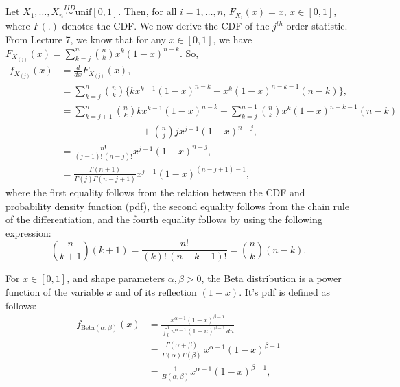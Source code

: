 \documentclass[a4paper,english,12pt]{article}
\begin{document}
\begin{exmp}
	Let $ X_1,\ldots,X_n \stackrel{IID}{\sim} \text{unif}\left[0,1\right] $. Then, for all $ i=1,\ldots,n $, $ F_{X_{i}}(x) = x $, $ x \in \left[0,1\right] $, where $ F(.) $ denotes the CDF. We now derive the CDF of the $ j^{th} $ order statistic. From Lecture 7, we know that for any $ x \in [0,1] $, we have $ F_{X_{\left(j\right)}} (x) = \sum_{k=j}^{n} \binom{n}{k} x^{k} (1-x)^{n-k}$. So,
	\begin{align}
	  	f_{X_{\left(j\right)}} (x)&=\frac{d}{dx} F_{X_{\left(j\right)}} (x),\nonumber\\
	  	&= \sum_{k=j}^{n} \binom{n}{k} \{k x^{k-1} (1-x)^{n-k} - x^{k} (1-x)^{n-k-1} (n-k)\},\nonumber\\
	  	&= \sum_{k=j+1}^{n} \binom{n}{k} k x^{k-1} (1-x)^{n-k}
	  	- \sum_{k=j}^{n-1} \binom{n}{k} x^{k} (1-x)^{n-k-1} (n-k)\nonumber\\
        &\hspace{100pt}+ \binom{n}{j} j x^{j-1} (1-x)^{n-j},\nonumber\\
	  	&= \frac{n!}{ (j-1)! \, (n-j)!  } x^{j-1} (1-x)^{n-j},\nonumber\\
	  	&= \frac{\Gamma(n+1)}{ \Gamma(j) \Gamma(n-j+1)  } x^{j-1} (1-x)^{(n-j+1)-1}, \label{unif_stat}
    \end{align}
    where the first equality follows from the relation between the CDF and probability density function (pdf), the second equality follows from the chain rule of the differentiation, and the fourth equality follows by using the following expression:
    \begin{equation}
      \binom{n}{k+1} (k+1) = \frac{n!}{ (k)! \, (n-k-1)! } = \binom{n}{k} (n-k). \nonumber
    \end{equation}    
    \begin{defn}
    	For $ x \in [0,1] $, and {shape parameters} $ \alpha, \beta > 0 $, the Beta distribution is a power function of the variable $ x $ and of its reflection $(1-x)$. It's pdf is defined as follows:    	
    	\begin{align*}
    		f_{\text{Beta}(\alpha, \beta)}(x) & = \frac{x^{\alpha-1}(1-x)^{\beta-1}}{\int_0^1 u^{\alpha-1} (1-u)^{\beta-1}\, du} \\
    		& = \frac{\Gamma(\alpha+\beta)}{\Gamma(\alpha)\Gamma(\beta)}\, x^{\alpha-1}(1-x)^{\beta-1} \\
    		& = \frac{1}{B(\alpha,\beta)} x^{\alpha-1}(1-x)^{\beta-1},
    	\end{align*}

\end{defn}
\end{exmp}
\end{document}
